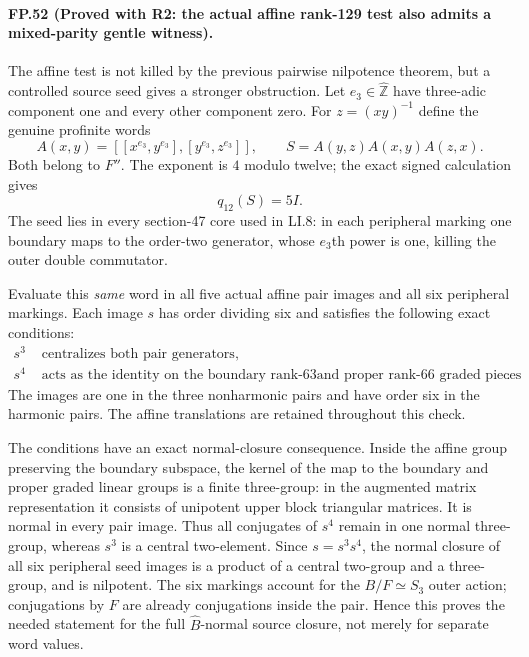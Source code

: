 \paragraph{FP.52 (Proved with R2: the actual affine rank-129 test also admits a mixed-parity gentle witness).}
The affine test is not killed by the previous pairwise
nilpotence theorem, but a controlled source seed gives a
stronger obstruction. Let $e_3\in\widehat{\mathbb Z}$ have
three-adic component one and every other component zero.
For $z=(xy)^{-1}$ define the genuine profinite words
\[
 A(x,y)=[[x^{e_3},y^{e_3}],[y^{e_3},z^{e_3}]],\qquad
 S=A(y,z)A(x,y)A(z,x).
 \tag{FP.52.1}
\]
Both belong to $F''$. The exponent is $4$ modulo twelve;
the exact signed calculation gives
\[
                            q_{12}(S)=5I.
\]
The seed lies in every section-47 core used in LI.8:
in each peripheral marking one boundary maps to the
order-two generator, whose $e_3$th power is one, killing
the outer double commutator.

Evaluate this \emph{same} word in all five actual affine
pair images and all six peripheral markings. Each image
$s$ has order dividing six and satisfies the following
exact conditions:
\[
 \begin{split}
 s^3&\text{ centralizes both pair generators},\\
 s^4&\text{ acts as the identity on the boundary rank-$63$
        and proper rank-$66$ graded pieces}.
 \end{split}
 \tag{FP.52.2}
\]
The images are one in the three nonharmonic pairs and have
order six in the harmonic pairs. The affine translations
are retained throughout this check.

The conditions have an exact normal-closure consequence.
Inside the affine group preserving the boundary subspace,
the kernel of the map to the boundary and proper graded
linear groups is a finite three-group: in the augmented
matrix representation it consists of unipotent upper block
triangular matrices. It is normal in every pair image.
Thus all conjugates of $s^4$ remain in one normal three-group,
whereas $s^3$ is a central two-element. Since
$s=s^3s^4$, the normal closure of all six peripheral seed
images is a product of a central two-group and a three-group,
and is nilpotent. The six markings account for the
$B/F\simeq S_3$ outer action; conjugations by $F$ are already
conjugations inside the pair. Hence this proves the needed
statement for the full $\widehat B$-normal source closure,
not merely for separate word values.

